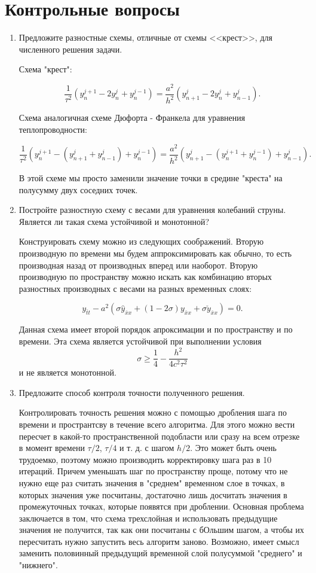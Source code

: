 \documentclass[12pt, a4paper]{article}
\begin{document}
\section{Контрольные вопросы}
\begin{enumerate}
\item Предложите разностные схемы, отличные от схемы <<крест>>,
для численного решения задачи.

Схема "крест":

\[
\dfrac{1}{\tau^2}(y_{n}^{j+1}- 2y_{n}^{j}+y_{n}^{j-1}) = \dfrac{a^2}{h^2}(y_{n+1}^{j}-2y_{n}^{j}+y_{n-1}^{j}).
\]

Схема аналогичная схеме Дюфорта - Франкела для уравнения теплопроводности: 

\[
\dfrac{1}{\tau^2}(y_{n}^{j+1}-(y_{n+1}^{j} + y_{n-1}^{j}) +y_{n}^{j-1}) = \dfrac{a^2}{h^2}(y_{n+1}^{j}-(y_{n}^{j+1} + y_{n}^{j-1})+y_{n-1}^{j}).
\]

В этой схеме мы просто заменили значение точки в средине "креста" на полусумму двух соседних точек. 


\item Постройте разностную схему с весами для уравнения колебаний струны. Является ли такая схема устойчивой и монотонной?

Конструировать схему можно из следующих соображений. Вторую производную по времени мы будем аппроксимировать как обычно, то есть производная назад от производных вперед или наоборот. Вторую производную по пространству можно искать как комбинацию вторых разностных производных с весами на разных временных слоях:

\[
y_{\bar{t}t} - a^2(\sigma \hat{y}_{\bar{x}x} + (1 - 2\sigma) y_{\bar{x}x} + \sigma  \check{y}_{\bar{x}x}) = 0.
\]

Данная схема имеет второй порядок апроксимации и по пространству и по времени. Эта схема является устойчивой при выполнении условия 
\[
\sigma \geqslant \dfrac{1}{4} - \dfrac{h^2}{4c^2\tau^2}
\]
и не является монотонной.

\item Предложите способ контроля точности полученного решения.

Контролировать точность решения можно с помощью дробления шага по времени и пространтсву в течение всего алгоритма. Для этого можно вести пересчет в какой-то пространственной подобласти или сразу на всем отрезке в момент времени $\tau/2$, $\tau/4$ и т. д. с шагом $h/2$. Это может быть очень трудоемко, поэтому можно производить корректировку шага раз в 10 итераций. Причем уменьшать шаг по пространству проще, потому что не нужно еще раз считать значения в "среднем"  временном слое в точках, в которых значения уже посчитаны, достаточно лишь досчитать значения в промежуточных точках, которые появятся при дроблении. Основная проблема заключается в том, что схема трехслойная и использовать предыдущие значения не получится, так как они посчитаны с бОльшим шагом, а чтобы их пересчитать нужно запустить весь алгоритм заново. Возможно, имеет смысл заменить половинный предыдущий временной слой полусуммой "среднего" и "нижнего".


\end{enumerate}
\end{document}
